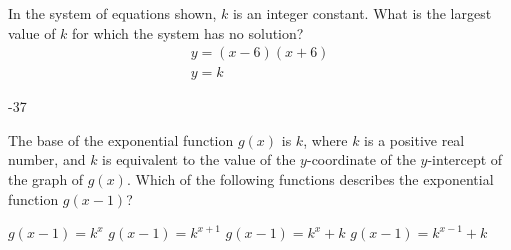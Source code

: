 \question[1]
In the system of equations shown, $k$ is an integer constant. What is the largest value of $k$ for which the system has no solution?
\[
  \begin{gathered}
  y=(x-6)(x+6) \\
  y=k
  \end{gathered}
\]
\begin{solution}
-37
\end{solution}




\newpage





\question[1]
The base of the exponential function $g(x)$ is $k$, where $k$ is a positive real number, and $k$ is equivalent to the value of the $y$-coordinate of the $y$-intercept of the graph of $g(x)$. Which of the following functions describes the exponential function $g(x-1)$?
\begin{choices}
  \CorrectChoice $g(x-1)=k^x$
  \choice $g(x-1)=k^{x+1}$
  \choice $g(x-1)=k^x+k$
  \choice $g(x-1)=k^{x-1}+k$
\end{choices}

